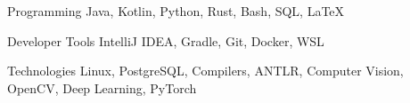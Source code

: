 

\begin{cvskills}

  \cvskill
    {Programming} %
    {Java, Kotlin, Python, Rust, Bash, SQL, LaTeX} %

  \cvskill
  {Developer Tools} %
  {IntelliJ IDEA, Gradle, Git, Docker, WSL} %

  \cvskill
  {Technologies} %
  {Linux, PostgreSQL, Compilers, ANTLR, Computer Vision, OpenCV, Deep Learning, PyTorch} %

\end{cvskills}
